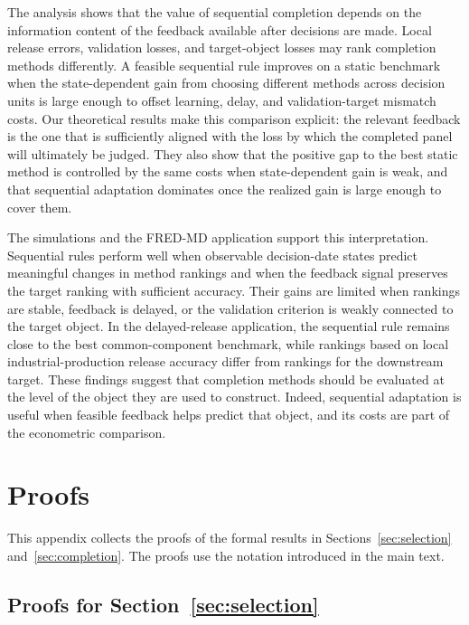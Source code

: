 \documentclass[a4paper, 12pt]{article}
\theoremstyle{plain}
\theoremstyle{remark}
\newcommand{\1}{\mathbf{1}}
\begin{document}
The analysis shows that the value of sequential completion depends on the information content of the feedback available after decisions are made. Local release errors, validation losses, and target-object losses may rank completion methods differently. A feasible sequential rule improves on a static benchmark when the state-dependent gain from choosing different methods across decision units is large enough to offset learning, delay, and validation-target mismatch costs. Our theoretical results make this comparison explicit: the relevant feedback is the one that is sufficiently aligned with the loss by which the completed panel will ultimately be judged. They also show that the positive gap to the best static method is controlled by the same costs when state-dependent gain is weak, and that sequential adaptation dominates once the realized gain is large enough to cover them.

The simulations and the FRED-MD application support this interpretation. Sequential rules perform well when observable decision-date states predict meaningful changes in method rankings and when the feedback signal preserves the target ranking with sufficient accuracy. Their gains are limited when rankings are stable, feedback is delayed, or the validation criterion is weakly connected to the target object. In the delayed-release application, the sequential rule remains close to the best common-component benchmark, while rankings based on local industrial-production release accuracy differ from rankings for the downstream target. These findings suggest that completion methods should be evaluated at the level of the object they are used to construct. Indeed, sequential adaptation is useful when feasible feedback helps predict that object, and its costs are part of the econometric comparison.

\appendix

\section{Proofs}
\label{app:proofs}

This appendix collects the proofs of the formal results in Sections~\ref{sec:selection} and~\ref{sec:completion}. The proofs use the notation introduced in the main text.

\subsection{Proofs for Section~\ref{sec:selection}}
\end{document}
